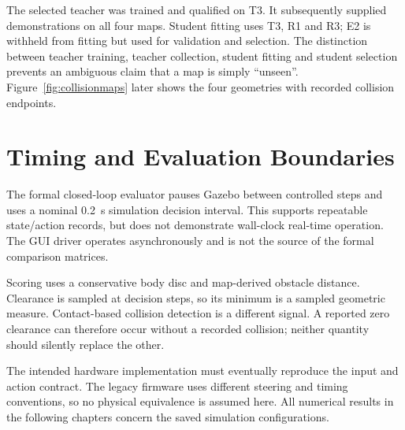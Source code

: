 The selected teacher was trained and qualified on T3. It subsequently supplied
demonstrations on all four maps. Student fitting uses T3, R1 and R3; E2 is
withheld from fitting but used for validation and selection. The distinction
between teacher training, teacher collection, student fitting and student
selection prevents an ambiguous claim that a map is simply ``unseen''.
Figure~\ref{fig:collisionmaps} later shows the four geometries with recorded
collision endpoints.

\section{Timing and Evaluation Boundaries}
The formal closed-loop evaluator pauses Gazebo between controlled steps and
uses a nominal 0.2~s simulation decision interval. This supports repeatable
state/action records, but does not demonstrate wall-clock real-time operation.
The GUI driver operates asynchronously and is not the source of the formal
comparison matrices.

Scoring uses a conservative body disc and map-derived obstacle distance.
Clearance is sampled at decision steps, so its minimum is a sampled geometric
measure. Contact-based collision detection is a different signal. A reported
zero clearance can therefore occur without a recorded collision; neither
quantity should silently replace the other.

The intended hardware implementation must eventually reproduce the input and
action contract. The legacy firmware uses different steering and timing
conventions, so no physical equivalence is assumed here. All numerical results
in the following chapters concern the saved simulation configurations.

